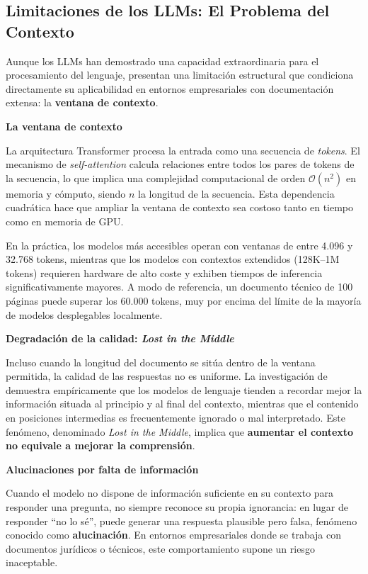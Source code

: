\newpage
\subsection{Limitaciones de los LLMs: El Problema del Contexto}

Aunque los LLMs han demostrado una capacidad extraordinaria para el procesamiento del lenguaje, presentan una limitación estructural que condiciona directamente su aplicabilidad en entornos empresariales con documentación extensa: la \textbf{ventana de contexto}.

\vspace{0.3cm}
\textbf{La ventana de contexto}

La arquitectura Transformer procesa la entrada como una secuencia de \textit{tokens}. El mecanismo de \textit{self-attention} calcula relaciones entre todos los pares de tokens de la secuencia, lo que implica una complejidad computacional de orden $\mathcal{O}(n^2)$ en memoria y cómputo, siendo $n$ la longitud de la secuencia. Esta dependencia cuadrática hace que ampliar la ventana de contexto sea costoso tanto en tiempo como en memoria de GPU.

En la práctica, los modelos más accesibles operan con ventanas de entre 4.096 y 32.768 tokens, mientras que los modelos con contextos extendidos (128K--1M tokens) requieren hardware de alto coste y exhiben tiempos de inferencia significativamente mayores. A modo de referencia, un documento técnico de 100 páginas puede superar los 60.000 tokens, muy por encima del límite de la mayoría de modelos desplegables localmente.

\vspace{0.3cm}
\textbf{Degradación de la calidad: \textit{Lost in the Middle}}

Incluso cuando la longitud del documento se sitúa dentro de la ventana permitida, la calidad de las respuestas no es uniforme. La investigación de \cite{liu2024lost} demuestra empíricamente que los modelos de lenguaje tienden a recordar mejor la información situada al principio y al final del contexto, mientras que el contenido en posiciones intermedias es frecuentemente ignorado o mal interpretado. Este fenómeno, denominado \textit{Lost in the Middle}, implica que \textbf{aumentar el contexto no equivale a mejorar la comprensión}.

\vspace{0.3cm}
\textbf{Alucinaciones por falta de información}

Cuando el modelo no dispone de información suficiente en su contexto para responder una pregunta, no siempre reconoce su propia ignorancia: en lugar de responder ``no lo sé'', puede generar una respuesta plausible pero falsa, fenómeno conocido como \textbf{alucinación}. En entornos empresariales donde se trabaja con documentos jurídicos o técnicos, este comportamiento supone un riesgo inaceptable.

